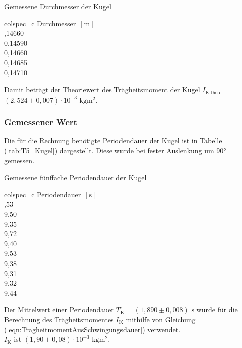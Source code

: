     \begin{table}[H]
      \centering 
      \caption{Gemessene Durchmesser der Kugel}
      \label{tab:Durchmesser_Kugel}
      \begin{tblr}{colspec={c}}
          \toprule
          Durchmesser $\,[\unit{\meter}]$ \\
          ,14660 \\
          0,14590 \\
          0,14660 \\
          0,14685 \\
          0,14710 \\
          \bottomrule
      \end{tblr}
    \end{table}
    Damit beträgt der Theoriewert des Trägheitsmoment der Kugel $I_{\text{K,theo}}$ $(2,524 \pm 0,007) \cdot 10^{-3} \,\,\unit{\kilo\gram\meter\squared}$.
%
    \subsubsection{Gemessener Wert}
    Die für die Rechnung benötigte Periodendauer der Kugel ist in Tabelle (\ref{tab:T5_Kugel}) dargestellt. 
    Diese wurde bei fester Auslenkung um 90° gemessen.
    \begin{table}[H]
      \centering 
      \caption{Gemessene fünffache Periodendauer der Kugel}
      \label{tab:T5_Kugel}
      \begin{tblr}{colspec={c}}
          \toprule
          Periodendauer $\,[\unit{\second}]$ \\
          ,53 \\
          9,50 \\
          9,35 \\
          9,72 \\
          9,40 \\
          9,53 \\
          9,38 \\
          9,31 \\
          9,32 \\
          9,44 \\
          \bottomrule
      \end{tblr}
    \end{table}
    Der Mittelwert einer Periodendauer $T_{\text{K}} = (1,890 \pm 0,008) \,\,\unit{\second}$ wurde für die Berechnung des 
    Trägheitsmomentes $I_{\text{K}}$ mithilfe von Gleichung (\ref{eqn:TragheitmomentAusSchwingungsdauer}) verwendet. \\
    $I_{\text{K}}$ ist $(1,90 \pm 0,08) \cdot 10^{-3} \,\,\unit{\kilo\gram\meter\squared}$.

